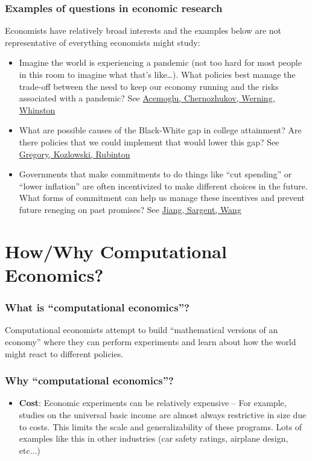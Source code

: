 \documentclass[10pt]{beamer}
\begin{document}
  
  \begin{frame} \frametitle{Examples of questions in economic research}
  
    Economists have relatively broad interests and the examples below are not representative of
    everything economists might study:
  
    \begin{itemize}
      \item Imagine the world is experiencing a pandemic (not too hard for most people in this room
        to imagine what that's like\dots). What policies best manage the trade-off between the need
        to keep our economy running and the risks associated with a pandemic? See
        \href{https://www.nber.org/papers/w27102}{Acemoglu, Chernozhukov, Werning, Whinston}
      \item What are possible causes of the Black-White gap in college attainment? Are there policies
        that we could implement that would lower this gap? See
        \href{https://s3.amazonaws.com/real.stlouisfed.org/wp/2022/2022-036.pdf}{Gregory, Kozlowski, Rubinton}
      \item Governments that make commitments to do things like ``cut spending'' or ``lower
        inflation'' are often incentivized to make different choices in the future. What forms of
        commitment can help us manage these incentives and prevent future reneging on past promises?
        See \href{http://www.tomsargent.com/research/LS_tom.pdf}{Jiang, Sargent, Wang}
    \end{itemize}

  \end{frame}


\section{How/Why Computational Economics?}

  \begin{frame} \frametitle{What is ``computational economics''?}

    Computational economists attempt to build ``mathematical versions of an economy'' where they
    can perform experiments and learn about how the world might react to different policies.

    \vspace{0.5cm}

  \end{frame}


  \begin{frame} \frametitle{Why ``computational economics''?}

    \begin{itemize}
      \item \textbf{Cost}: Economic experiments can be relatively expensive -- For example,
        studies on the universal basic income are almost always restrictive in size due to costs.
        This limits the scale and generalizability of these programs. Lots of examples like this
        in other industries (car safety ratings, airplane design, etc...)
    \end{itemize}
  \end{frame}
\end{document}
